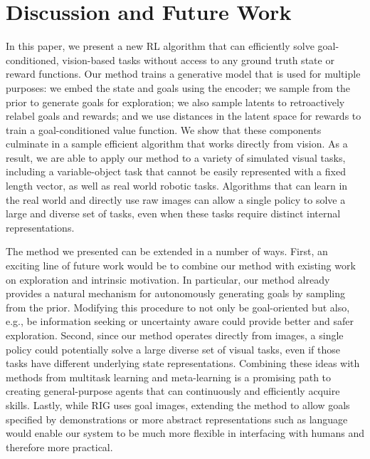 \documentclass{article}
\begin{document}
\section{Discussion and Future Work}

In this paper, we present a new RL algorithm that can efficiently solve goal-conditioned, vision-based tasks without access to any ground truth state or reward functions.
Our method trains a generative model that is used for multiple purposes: we embed the state and goals using the encoder; we sample from the prior to generate goals for exploration; we also sample latents to retroactively relabel goals and rewards; and we use distances in the latent space for rewards to train a goal-conditioned value function.
We show that these components culminate in a sample efficient algorithm that works directly from vision.
As a result, we are able to apply our method to a variety of simulated visual tasks, including a variable-object task that cannot be easily represented with a fixed length vector, as well as real world robotic tasks.
Algorithms that can learn in the real world and directly use raw images can allow a single policy to solve a large and diverse set of tasks, even when these tasks require distinct internal representations.

The method we presented can be extended in a number of ways.
First, an exciting line of future work would be to combine our method with existing work on exploration and intrinsic motivation.
In particular, our method already provides a natural mechanism for autonomously generating goals by sampling from the prior.
Modifying this procedure to not only be goal-oriented but also, e.g., be information seeking or uncertainty aware could provide better and safer exploration.
Second, since our method operates directly from images, a single policy could potentially solve a large diverse set of visual tasks, even if those tasks have different underlying state representations.
Combining these ideas with methods from multitask learning and meta-learning is a promising path to creating general-purpose agents that can continuously and efficiently acquire skills.
Lastly, while RIG uses goal images, extending the method to allow goals specified by demonstrations or more abstract representations such as language would enable our system to be much more flexible in interfacing with humans and therefore more practical.

\end{document}
